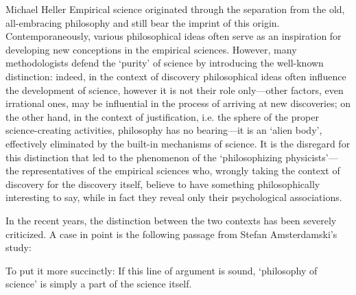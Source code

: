 \begin{artengenv}{Michael Heller}
Empirical science originated through the separation from the old, all-embracing philosophy and still bear the
imprint of this origin. Contemporaneously, various philosophical ideas often serve as an inspiration for developing new
conceptions in the empirical sciences. However, many methodologists defend the `purity' of science by introducing the
well-known distinction: indeed, in the context of discovery philosophical ideas often influence the development of
science, however it is not their role only---other factors, even irrational ones, may be influential in the process of
arriving at new discoveries; on the other hand, in the context of justification, i.e. the sphere of the proper
science-creating activities, philosophy has no bearing---it is an `alien body', effectively eliminated by the built-in
mechanisms of science. It is the disregard for this distinction that led to the phenomenon of the `philosophizing
physicists'---the representatives of the empirical sciences who, wrongly taking the context of discovery for the
discovery itself, believe to have something philosophically interesting to say, while in fact they reveal only their
psychological associations.

In the recent years, the distinction between the two contexts has been severely criticized. A case in point is the
following passage from Stefan Amsterdamski's study: %

To put it more
succinctly: %
If this line of argument is sound,
`philosophy of science' is simply a part of the science itself.


\end{artengenv}
